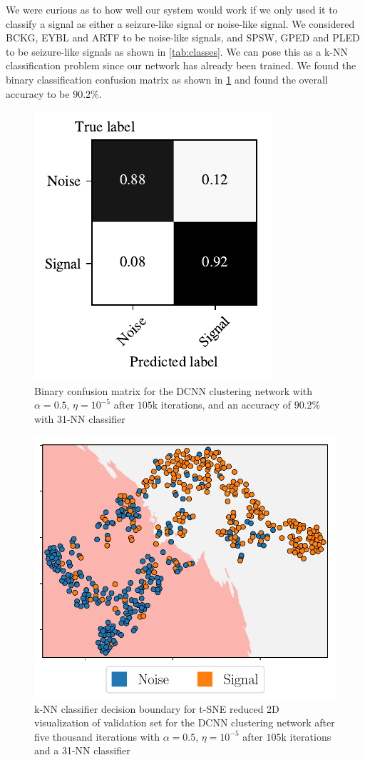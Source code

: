 We were curious as to how well our system would work if we only used it to classify a signal as either a seizure-like signal or noise-like signal.  We considered BCKG, EYBL and ARTF to be noise-like signals, and SPSW, GPED and PLED to be seizure-like signals as shown in \cref{tab:classes}. We can pose this as a k-NN classification problem since our network has already been trained. We found the binary classification confusion matrix as shown in \cref{fig:conf_mat_exp_pooled} and found the overall accuracy to be $90.2\%$.

\begin{figure}[!ht]
	\centering
	\includegraphics[width=0.425\linewidth]{pictures/conf_mat_exp_pooled.pdf}
	\caption[Binary Confusion Matrix for  the DCNN Clustering Network]{Binary confusion matrix for the DCNN clustering network with $\alpha = 0.5$, $\eta = 10^{-5}$ after $105$k iterations, and an accuracy of $90.2\%$ with 31-NN classifier}\label{fig:conf_mat_exp_pooled}
\end{figure}

\begin{figure}[!ht]
	\centering
	\includegraphics[width=0.7\linewidth]{pictures/tsne_plot_binary.pdf}
	\caption[k-NN Binary Decision Boundary on t-SNE Reduced Embedding]{k-NN classifier decision boundary for t-SNE reduced 2D visualization of validation set for the DCNN clustering network after five thousand iterations with $\alpha = 0.5$, $\eta = 10^{-5}$ after $105$k iterations and a 31-NN classifier}\label{fig:tsne_plot_binary}  
\end{figure}

